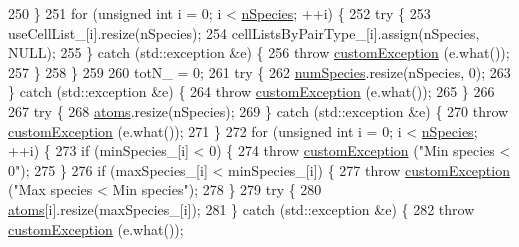 \begin{DoxyCode}
250                 \}
251                 \textcolor{keywordflow}{for} (\textcolor{keywordtype}{unsigned} \textcolor{keywordtype}{int} i = 0; i < \hyperlink{classsim_system_ab5e2e9b6204de15520302fe1d51688dd}{nSpecies}; ++i) \{
252                                 \textcolor{keywordflow}{try} \{
253                                                 useCellList\_[i].resize(nSpecies);
254                                                 cellListsByPairType\_[i].assign(nSpecies, NULL);
255                                 \} \textcolor{keywordflow}{catch} (std::exception &e) \{
256                                                 \textcolor{keywordflow}{throw} \hyperlink{classcustom_exception}{customException} (e.what());
257                                 \}
258                 \}
259     
260                 totN\_ = 0;
261     \textcolor{keywordflow}{try} \{
262                                 \hyperlink{classsim_system_a9eea865e6dc1cff377b1e79c4d9c23f0}{numSpecies}.resize(nSpecies, 0);
263                 \} \textcolor{keywordflow}{catch} (std::exception &e) \{
264                                 \textcolor{keywordflow}{throw} \hyperlink{classcustom_exception}{customException} (e.what());
265                 \}
266     
267     \textcolor{keywordflow}{try} \{
268         \hyperlink{classsim_system_a90421b19082f7fb8fc23b7264b1161e4}{atoms}.resize(nSpecies);
269     \} \textcolor{keywordflow}{catch} (std::exception &e) \{
270         \textcolor{keywordflow}{throw} \hyperlink{classcustom_exception}{customException} (e.what());
271     \}
272     \textcolor{keywordflow}{for} (\textcolor{keywordtype}{unsigned} \textcolor{keywordtype}{int} i = 0; i < \hyperlink{classsim_system_ab5e2e9b6204de15520302fe1d51688dd}{nSpecies}; ++i) \{
273         \textcolor{keywordflow}{if} (minSpecies\_[i] < 0) \{
274             \textcolor{keywordflow}{throw} \hyperlink{classcustom_exception}{customException} (\textcolor{stringliteral}{"Min species < 0"});
275         \}
276         \textcolor{keywordflow}{if} (maxSpecies\_[i] < minSpecies\_[i]) \{
277             \textcolor{keywordflow}{throw} \hyperlink{classcustom_exception}{customException} (\textcolor{stringliteral}{"Max species < Min species"});
278         \}
279                                 \textcolor{keywordflow}{try} \{
280                                                 \hyperlink{classsim_system_a90421b19082f7fb8fc23b7264b1161e4}{atoms}[i].resize(maxSpecies\_[i]);
281                                 \} \textcolor{keywordflow}{catch} (std::exception &e) \{
282                                                 \textcolor{keywordflow}{throw} \hyperlink{classcustom_exception}{customException} (e.what());

\end{DoxyCode}
